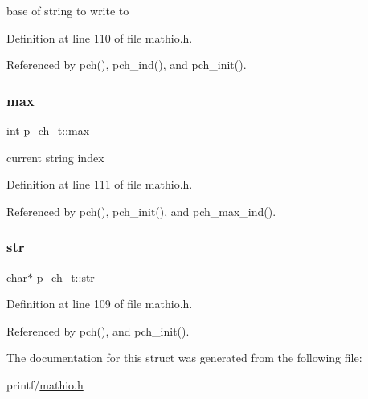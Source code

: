 base of string to write to 



Definition at line 110 of file mathio.\+h.



Referenced by pch(), pch\+\_\+ind(), and pch\+\_\+init().

\mbox{\label{structp__ch__t_a0dee9f28e498d427e53051b7e1846d34}} 
\subsubsection{\texorpdfstring{max}{max}}
{\footnotesize\ttfamily int p\+\_\+ch\+\_\+t\+::max}



current string index 



Definition at line 111 of file mathio.\+h.



Referenced by pch(), pch\+\_\+init(), and pch\+\_\+max\+\_\+ind().

\mbox{\label{structp__ch__t_aa3c8616342a2717bc714bf1b6d00516f}} 
\subsubsection{\texorpdfstring{str}{str}}
{\footnotesize\ttfamily char$\ast$ p\+\_\+ch\+\_\+t\+::str}



Definition at line 109 of file mathio.\+h.



Referenced by pch(), and pch\+\_\+init().



The documentation for this struct was generated from the following file\+:\begin{DoxyCompactItemize}
\item 
printf/\hyperlink{mathio_8h}{mathio.\+h}\end{DoxyCompactItemize}
